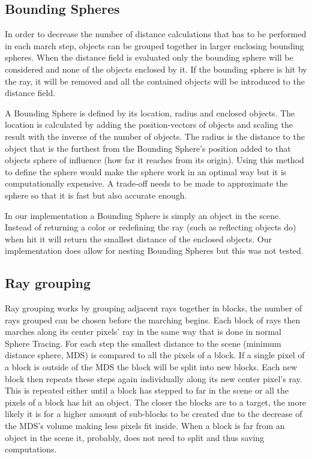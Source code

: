 		\subsection{Bounding Spheres}
			
			In order to decrease the number of distance calculations that has 
			to be performed in each march step, objects can be grouped together 
			in larger enclosing bounding spheres. When the distance field is 
			evaluated only the bounding sphere will be considered and none of 
			the objects enclosed by	it. If the bounding sphere is hit by the 
			ray, it will be removed and all	the contained objects will be 
			introduced to the distance field.
			
			A Bounding Sphere is defined by its location, radius and enclosed
			objects. The location is calculated by adding the position-vectors
			of objects and scaling the result with the inverse of the number of
			objects. The radius is the distance to the object that is the
			furthest from the Bounding Sphere's position added to that objects
			sphere of influence (how far it reaches from its origin). Using 
			this method to define the sphere would make the sphere work in an 
			optimal way but it is computationally expensive. A trade-off needs 
			to be made to approximate the sphere so that it is fast but also 
			accurate enough.

			In our implementation a Bounding Sphere is simply an object in the
			scene. Instead of returning a color or redefining the ray (such 
			as reflecting objects do) when hit it will return the smallest 
			distance of the enclosed objects. Our implementation does allow for
			nesting Bounding Spheres but this was not tested.
			
		\subsection{Ray grouping}
		
			
		
			Ray grouping works by grouping adjacent rays together in blocks, the number of 
			rays grouped can be chosen before the marching begins. Each block of rays
			then marches along its center pixels' ray in the same way that is done 
			in normal Sphere Tracing. For each step the smallest distance to 
			the scene (minimum distance sphere, MDS) is compared to all the pixels of a block. If a single pixel 
			of a block is outside of the MDS the block will be split into new 
			blocks. Each new block then repeats these steps again individually 
			along its new center pixel's ray. This is repeated either until a block
			has stepped to far in the scene or all the pixels of a block has hit an
			object. The closer the blocks 
			are to a target, the more likely it is for a higher amount of sub-blocks 
			to be created due to the decrease of the MDS's volume making less pixels 
			fit inside. When a block is far from an object in the scene it, probably, 
			does not need to split and thus saving computations.
			
